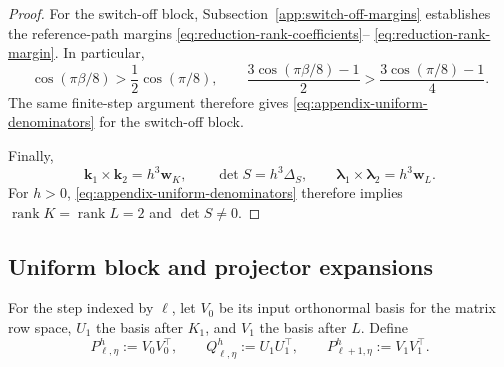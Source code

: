 \documentclass[10pt,a4paper]{amsart}
\numberwithin{equation}{section}
\begin{document}
\begin{proof}
For the switch-off block, Subsection~\ref{app:switch-off-margins}
establishes the reference-path margins
\eqref{eq:reduction-rank-coefficients}--
\eqref{eq:reduction-rank-margin}.  In particular,
\begin{equation}\label{eq:appendix-switch-off-margin-comparison}
 \cos(\pi\beta/8)>\frac12\cos(\pi/8),\qquad
 \frac{3\cos(\pi\beta/8)-1}{2}
 >\frac{3\cos(\pi/8)-1}{4}.
\end{equation}
The same finite-step argument therefore gives
\eqref{eq:appendix-uniform-denominators} for the switch-off block.

Finally,
\begin{equation}\label{eq:appendix-rank-conclusion}
 \boldsymbol k_1\times\boldsymbol k_2=h^3\boldsymbol w_K,
 \qquad \det S=h^3\Delta_S,
 \qquad \boldsymbol\lambda_1\times\boldsymbol\lambda_2=h^3\boldsymbol w_L.
\end{equation}
For \(h>0\), \eqref{eq:appendix-uniform-denominators} therefore implies
\(\operatorname{rank}K=\operatorname{rank}L=2\) and \(\det S\ne0\).
\end{proof}

\subsection{Uniform block and projector expansions}
\label{app:uniform-block-expansions}

For the step indexed by \(\ell\), let \(V_0\) be its input orthonormal
basis for the matrix row space,
\(U_1\) the basis after \(K_1\), and \(V_1\) the basis after \(L\).
Define
\begin{equation}\label{eq:appendix-projector-definitions}
 P^h_{\ell,\eta}:=V_0V_0^\top,
 \qquad
 Q^h_{\ell,\eta}:=U_1U_1^\top,
 \qquad
 P^h_{\ell+1,\eta}:=V_1V_1^\top.
\end{equation}
\end{document}
